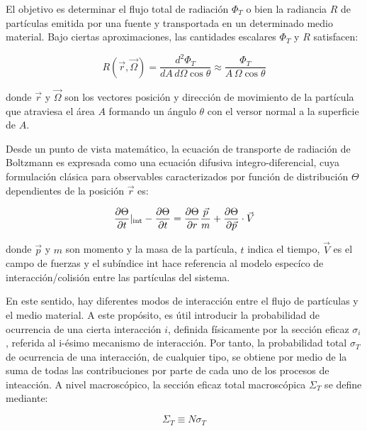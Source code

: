 El objetivo es determinar el flujo total de radiación $\Phi_{T}$ o bien la radiancia $R$ de partículas emitida por una fuente y transportada en un determinado medio material. Bajo ciertas aproximaciones, las cantidades escalares $\Phi_{T}$ y $R$ satisfacen:

\begin{equation}
 R\left(\vec{r}, \vec{\Omega}\right) = \frac{d^{2}\Phi_{T}}{dA\, d\Omega \cos{\theta}} \approx \frac{\Phi_{T}}{A\, \Omega \cos{\theta}}
\end{equation}

\noindent
donde $\vec{r}$ y $\vec{\Omega}$ son los vectores posición y dirección de movimiento de la partícula que atraviesa el área $A$ formando un ángulo $\theta$ con el versor normal a la superficie de $A$.

Desde un punto de vista matemático, la ecuación de transporte de radiación de Boltzmann es expresada como una ecuación difusiva integro-diferencial, cuya formulación clásica para observables caracterizados por función de distribución $\Theta$ dependientes de la posición $\vec{r}$ es:

\begin{equation}
 \frac{\partial \Theta}{\partial t} \arrowvert_{\textrm{int}} - \frac{\partial \Theta}{\partial t} = \frac{\partial \Theta}{\partial r} \frac{\vec{p}}{m} + \frac{\partial \Theta}{\partial \vec{p}}\cdot \vec{V}
 \label{eq.int-dif}
\end{equation}

\noindent
donde $\vec{p}$ y $m$ son momento y la masa de la partícula, $t$ indica el tiempo, $\vec{V}$ es el campo de fuerzas y el subíndice $\textrm{int}$ hace referencia al modelo especíco de interacción/colisión entre las partículas del sistema.

En este sentido, hay diferentes modos de interacción entre el flujo de partículas y el medio material. A este propósito, es útil introducir la probabilidad de ocurrencia de una cierta interacción $i$, definida físicamente por la sección eficaz $\sigma_{i}$ , referida al i-ésimo mecanismo de interacción. Por tanto, la probabilidad total $\sigma_{T}$ de ocurrencia de una interacción, de cualquier tipo, se obtiene por
medio de la suma de todas las contribuciones por parte de cada uno de los procesos de inteacción. A nivel macroscópico, la sección eficaz total macroscópica $\Sigma_{T}$ se define mediante:

\begin{equation}
 \Sigma_{T} \equiv N \sigma_{T}
\end{equation}

